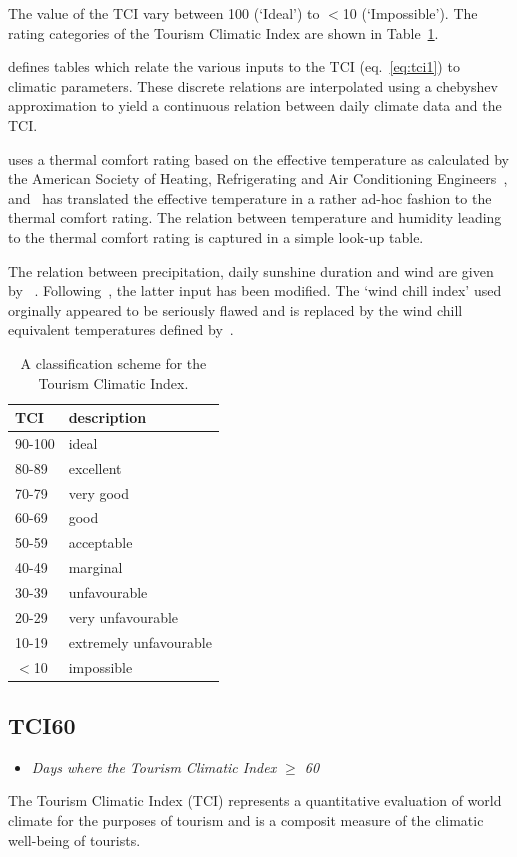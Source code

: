 \documentclass[a4paper,11pt]{article}
\begin{document}
The value of the TCI vary between 100 (`Ideal') to $<$10 (`Impossible'). The rating categories of the
Tourism Climatic Index are shown in Table~\ref{table:TCI}.

\citet{mieczkowski:85} defines tables which relate the various inputs to the TCI (eq.~\ref{eq:tci1}) to
climatic parameters. These discrete relations are interpolated using a chebyshev approximation to yield
a continuous relation between daily climate data and the TCI. 

\citet{mieczkowski:85} uses a thermal comfort rating based on the effective temperature as
calculated by the American Society of Heating, Refrigerating and Air Conditioning Engineers~\citep{ashrae:72},
and~\citet{mieczkowski:85} has translated
the effective temperature in a rather ad-hoc fashion to the thermal comfort rating. The relation
between temperature and humidity leading to the thermal comfort rating is captured in a simple
look-up table.

The relation between precipitation, daily sunshine duration and wind are given by ~\citet{mieczkowski:85}. 
Following~\citet{perch-nielsen:10}, the latter input has been modified. The `wind chill index' 
used orginally appeared to be seriously flawed and is replaced by the wind chill equivalent temperatures
defined by~\citet{osczevski:05}.

\begin{table} [!h]
\begin{tabular}{l l}
TCI & description \\
\hline
90-100 & ideal \\
80-89  & excellent \\
70-79  & very good \\
60-69  & good \\
50-59  & acceptable \\
40-49  & marginal \\
30-39  & unfavourable \\
20-29  & very unfavourable \\
10-19  & extremely unfavourable \\
$<$10  & impossible \\
\end{tabular}
\caption{A classification scheme for the Tourism Climatic Index.
} \label{table:TCI}
\end{table}



\subsection*{TCI60}
\begin{itemize}
\item \textit{Days where the Tourism Climatic Index $\ge$ 60}
\end{itemize}
The Tourism Climatic Index (TCI) represents a quantitative evaluation
of world climate for the purposes of tourism and is a composit
measure of the climatic well-being of tourists. 
\end{document}
